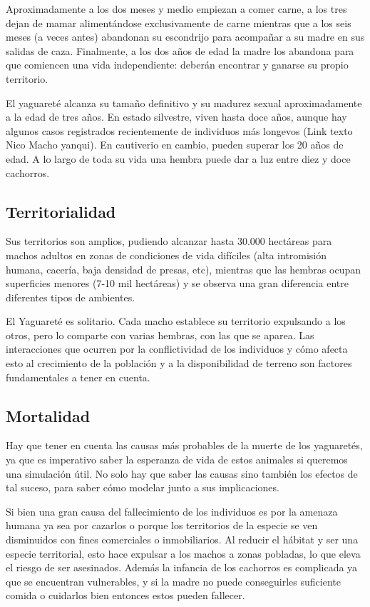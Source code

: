     Aproximadamente a los dos meses y medio empiezan a comer carne, a los tres dejan de mamar alimentándose exclusivamente de carne mientras que a los seis meses (a veces antes) abandonan su escondrijo para acompañar a su madre en sus salidas de caza. Finalmente, a los dos años de edad la madre los abandona para que comiencen una vida independiente: deberán encontrar y ganarse su propio territorio.
    
    El yaguareté alcanza su tamaño definitivo y su madurez sexual aproximadamente a la edad de tres años. En estado silvestre, viven hasta doce años, aunque hay algunos casos registrados recientemente de individuos más longevos (Link texto Nico Macho yanqui). En cautiverio en cambio, pueden superar los 20 años de edad. A lo largo de toda su vida una hembra puede dar a luz entre diez y doce cachorros.

    \subsection{Territorialidad}
    Sus territorios son amplios, pudiendo alcanzar hasta 30.000 hectáreas para machos adultos en zonas de condiciones de vida difíciles (alta intromisión humana, cacería, baja densidad de presas, etc), mientras que las hembras ocupan superficies menores (7-10 mil hectáreas) y se observa una gran diferencia entre diferentes tipos de ambientes.
    
    El Yaguareté es solitario. Cada macho establece su territorio expulsando a los otros, pero lo comparte con varias hembras, con las que se aparea. Las interacciones que ocurren por la conflictividad de los individuos y cómo afecta esto al crecimiento de la población y a la disponibilidad de terreno son factores fundamentales a tener en cuenta.
    
    \subsection{Mortalidad}
    Hay que tener en cuenta las causas más probables de la muerte de los yaguaretés, ya que es imperativo saber la esperanza de vida de estos animales si queremos una simulación útil. No solo hay que saber las causas sino también los efectos de tal suceso, para saber cómo modelar junto a sus implicaciones.
    
    Si bien una gran causa del fallecimiento de los individuos es por la amenaza humana ya sea por cazarlos o porque los territorios de la especie se ven disminuidos con fines comerciales o inmobiliarios. Al reducir el hábitat y ser una especie territorial, esto hace expulsar a los machos a zonas pobladas, lo que eleva el riesgo de ser asesinados.
    Además la infancia de los cachorros es complicada ya que se encuentran vulnerables, y si la madre no puede conseguirles suficiente comida o cuidarlos bien entonces estos pueden fallecer.

